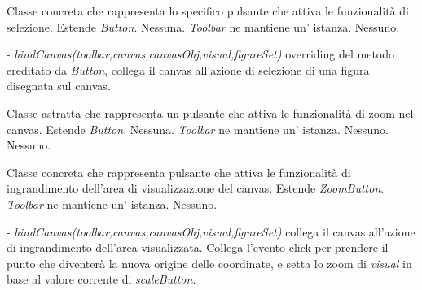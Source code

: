 Classe concreta che rappresenta lo specifico pulsante che attiva le funzionalit\` a di selezione.
Estende \textit{Button}.
Nessuna.
\textit{Toolbar} ne mantiene un' istanza.
Nessuno.
\begin{elencopuntato}[\subsubsecindent]
\item[-]  \textit{bindCanvas(toolbar,canvas,canvasObj,visual,figureSet)} overriding del metodo ereditato da \textit{Button}, collega il canvas all'azione di selezione di una figura disegnata sul canvas.
\end{elencopuntato}


Classe astratta che rappresenta un pulsante che attiva le funzionalit\` a di zoom nel canvas.
Estende \textit{Button}.
Nessuna.
\textit{Toolbar} ne mantiene un' istanza.
Nessuno.
Nessuno.

Classe concreta che rappresenta pulsante che attiva le funzionalit\` a di ingrandimento dell'area di visualizzazione del canvas.
Estende \textit{ZoomButton}.
\textit{Toolbar} ne mantiene un' istanza.
Nessuno.
\begin{elencopuntato}[\subsubsecindent]
\item[-] \textit{bindCanvas(toolbar,canvas,canvasObj,visual,figureSet)} collega il canvas all'azione di ingrandimento dell'area visualizzata. Collega l'evento click per prendere il punto che diventer\`a la nuova origine delle coordinate, e setta lo zoom di \textit{visual} in base al valore corrente di \textit{scaleButton}.
\end{elencopuntato}

